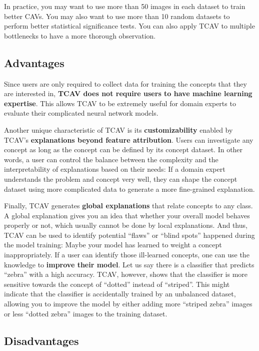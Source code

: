 \documentclass[
  12pt,
]{krantz}
\begin{document}
In practice, you may want to use more than 50 images in each dataset to train better CAVs.
You may also want to use more than 10 random datasets to perform better statistical significance tests.
You can also apply TCAV to multiple bottlenecks to have a more thorough observation.

\hypertarget{advantages-20}{%
\subsection{Advantages}\label{advantages-20}}

Since users are only required to collect data for training the concepts that they are interested in, \textbf{TCAV does not require users to have machine learning expertise}.
This allows TCAV to be extremely useful for domain experts to evaluate their complicated neural network models.

Another unique characteristic of TCAV is its \textbf{customizability} enabled by TCAV's \textbf{explanations beyond feature attribution}.
Users can investigate any concept as long as the concept can be defined by its concept dataset.
In other words, a user can control the balance between the complexity and the interpretability of explanations based on their needs: If a domain expert understands the problem and concept very well, they can shape the concept dataset using more complicated data to generate a more fine-grained explanation.

Finally, TCAV generates \textbf{global explanations} that relate concepts to any class.
A global explanation gives you an idea that whether your overall model behaves properly or not, which usually cannot be done by local explanations.
And thus, TCAV can be used to identify potential ``flaws'' or ``blind spots'' happened during the model training: Maybe your model has learned to weight a concept inappropriately.
If a user can identify those ill-learned concepts, one can use the knowledge to \textbf{improve their model}.
Let us say there is a classifier that predicts ``zebra'' with a high accuracy. TCAV, however, shows that the classifier is more sensitive towards the concept of ``dotted'' instead of ``striped''.
This might indicate that the classifier is accidentally trained by an unbalanced dataset, allowing you to improve the model by either adding more ``striped zebra'' images or less ``dotted zebra'' images to the training dataset.

\hypertarget{disadvantages-20}{%
\subsection{Disadvantages}\label{disadvantages-20}}
\end{document}

